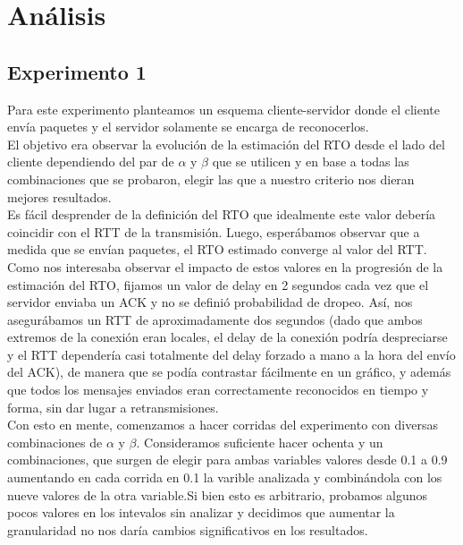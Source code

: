 \section{Análisis}

\subsection{Experimento 1}

\indent \indent Para este experimento planteamos un esquema cliente-servidor donde el cliente envía paquetes y el servidor solamente se encarga de reconocerlos.\\

\indent El objetivo era observar la evolución de la estimación del RTO desde el lado del cliente dependiendo del par de $\alpha$ y $\beta$ que se utilicen y en base a todas las combinaciones que se probaron, elegir las que a nuestro criterio nos dieran mejores resultados.\\

\indent Es fácil desprender de la definición del RTO que idealmente este valor debería coincidir con el RTT de la transmisión. Luego, esperábamos observar que a medida que se envían paquetes, el RTO estimado converge al valor del RTT.\\

\indent Como nos interesaba observar el impacto de estos valores en la progresión de la estimación del RTO, fijamos un valor de delay en 2 segundos cada vez que el servidor enviaba un ACK y no se definió probabilidad de dropeo. Así, nos asegurábamos un RTT de aproximadamente dos segundos (dado que ambos extremos de la conexión eran locales, el delay de la conexión podría despreciarse y el RTT dependería casi totalmente del delay forzado a mano a la hora del envío del ACK), de manera que se podía contrastar fácilmente en un gráfico, y además que todos los mensajes enviados eran correctamente reconocidos en tiempo y forma, sin dar lugar a retransmisiones.\\

\indent Con esto en mente, comenzamos a hacer corridas del experimento con diversas combinaciones de $\alpha$ y $\beta$. Consideramos suficiente hacer ochenta y un combinaciones, que surgen de elegir para ambas variables valores desde 0.1 a 0.9 aumentando en cada corrida en 0.1 la varible analizada y combinándola con los nueve valores de la otra variable.Si bien esto es arbitrario, probamos algunos pocos valores en los intevalos sin analizar y decidimos que aumentar la granularidad no nos daría cambios significativos en los resultados.\\

